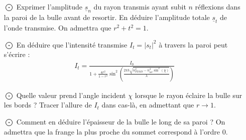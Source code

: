 \documentclass{report}
\begin{document}
\begin{itemize}

	\item[$\bigodot$] Exprimer l'amplitude $\underline{s}_n$ du rayon transmis ayant subit $n$ réflexions dans la paroi de la bulle avant de resortir. En déduire l'amplitude totale $\underline{s}_t$ de l'onde transmise. On admettra que $r^2+t^2=1$.
	
	\item[$\bigodot$] En déduire que l'intensité transmise $I_t=|s_t|^2$ à travers la paroi peut s'écrire : 
	\begin{align*}
		I_t = \frac{I_0}{1+\frac{4r^2}{1-r^2}\sin^2\left(\frac{2\pi h\sqrt{n_{PDMS}^2-n^2_{air}\sin^2(\chi)}}{\lambda}\right)  }
	\end{align*}
	
	\item[$\bigodot$] Quelle valeur prend l'angle incident $\chi$ lorsque le rayon éclaire la bulle sur les bords ? Tracer l'allure de $I_t$ dans cas-là, en admettant que $r\longrightarrow1$.
	
	\item[$\bigodot$] Comment en déduire l'épaisseur de la bulle le long de sa paroi ? On admettra que la frange la plus proche du sommet correspond à l'ordre 0.

\end{itemize}
\end{document}

